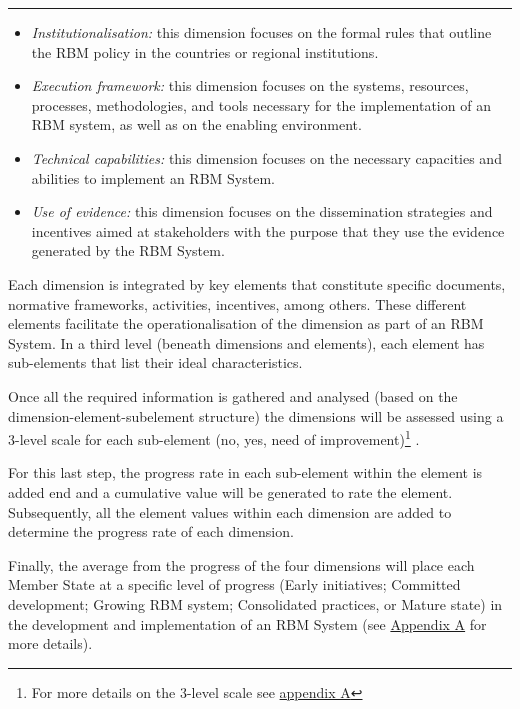 \documentclass[
  10pt,
]{book}
\begin{document}
\begin{center}\rule{0.5\linewidth}{0.5pt}\end{center}

\begin{itemize}
\item
  \emph{Institutionalisation:} this dimension focuses on the formal rules that outline the RBM policy in the countries or regional institutions.
\item
  \emph{Execution framework:} this dimension focuses on the systems, resources, processes, methodologies, and tools necessary for the implementation of an RBM system, as well as on the enabling environment.
\item
  \emph{Technical capabilities:} this dimension focuses on the necessary capacities and abilities to implement an RBM System.
\item
  \emph{Use of evidence:} this dimension focuses on the dissemination strategies and incentives aimed at stakeholders with the purpose that they use the evidence generated by the RBM System.
\end{itemize}

Each dimension is integrated by key elements that constitute specific documents, normative frameworks, activities, incentives, among others. These different elements facilitate the operationalisation of the dimension as part of an RBM System. In a third level (beneath dimensions and elements), each element has sub-elements that list their ideal characteristics.

Once all the required information is gathered and analysed (based on the dimension-element-subelement structure) the dimensions will be assessed using a 3-level scale for each sub-element (no, yes, need of improvement)\footnote{For more details on the 3-level scale see \protect\hyperlink{appendixA}{appendix A}} .

For this last step, the progress rate in each sub-element within the element is added end and a cumulative value will be generated to rate the element. Subsequently, all the element values within each dimension are added to determine the progress rate of each dimension.

Finally, the average from the progress of the four dimensions will place each Member State at a specific level of progress (Early initiatives; Committed development; Growing RBM system; Consolidated practices, or Mature state) in the development and implementation of an RBM System (see \protect\hyperlink{appendixA}{Appendix A} for more details).
\end{document}
